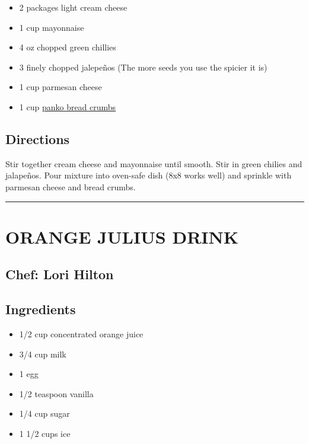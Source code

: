 \documentclass[
]{book}
\providecommand{\tightlist}{%
  \setlength{\itemsep}{0pt}\setlength{\parskip}{0pt}}
\begin{document}
\begin{itemize}
\tightlist
\item
  2 packages light cream cheese
\item
  1 cup mayonnaise
\item
  4 oz chopped green chillies
\item
  3 finely chopped jalepeños (The more seeds you use the spicier it is)
\item
  1 cup parmesan cheese
\item
  1 cup \href{https://en.wikipedia.org/wiki/Bread_crumbs\#Panko}{panko bread crumbs}
\end{itemize}

\hypertarget{directions-8}{%
\subsection*{Directions}\label{directions-8}}


Stir together cream cheese and mayonnaise until smooth. Stir in green chilies and jalapeños. Pour mixture into oven-safe dish (8x8 works well) and sprinkle with parmesan cheese and bread crumbs.

\begin{center}\rule{0.5\linewidth}{0.5pt}\end{center}

\hypertarget{orange-julius-drink}{%
\section*{ORANGE JULIUS DRINK}\label{orange-julius-drink}}


\hypertarget{chef-lori-hilton}{%
\subsection*{Chef: Lori Hilton}\label{chef-lori-hilton}}


\hypertarget{ingredients-9}{%
\subsection*{Ingredients}\label{ingredients-9}}


\begin{itemize}
\tightlist
\item
  1/2 cup concentrated orange juice
\item
  3/4 cup milk
\item
  1 egg
\item
  1/2 teaspoon vanilla
\item
  1/4 cup sugar
\item
  1 1/2 cups ice
\end{itemize}
\end{document}
